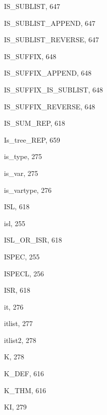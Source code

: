 \begin{theindex}
  \item {\ptt IS\_SUBLIST}, 647
  \item {\ptt IS\_SUBLIST\_APPEND}, 647
  \item {\ptt IS\_SUBLIST\_REVERSE}, 647
  \item {\ptt IS\_SUFFIX}, 648
  \item {\ptt IS\_SUFFIX\_APPEND}, 648
  \item {\ptt IS\_SUFFIX\_IS\_SUBLIST}, 648
  \item {\ptt IS\_SUFFIX\_REVERSE}, 648
  \item {\ptt IS\_SUM\_REP}, 618
  \item {\ptt Is\_tree\_REP}, 659
  \item {\ptt is\_type}, 275
  \item {\ptt is\_var}, 275
  \item {\ptt is\_vartype}, 276
  \item {\ptt ISL}, 618
  \item {\ptt isl}, 255
  \item {\ptt ISL\_OR\_ISR}, 618
  \item {\ptt ISPEC}, 255
  \item {\ptt ISPECL}, 256
  \item {\ptt ISR}, 618
  \item {\ptt it}, 276
  \item {\ptt itlist}, 277
  \item {\ptt itlist2}, 278

  \indexspace

  \item {\ptt K}, 278
  \item {\ptt K\_DEF}, 616
  \item {\ptt K\_THM}, 616
  \item {\ptt KI}, 279

  \indexspace


\end{theindex}
